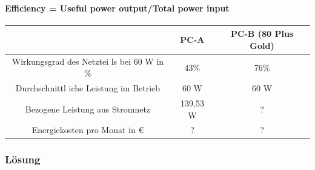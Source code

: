 \documentclass[a4paper]{article}
\begin{document}
            \paragraph{\color{codegreen} Efficiency = Useful power output/Total power input}
            \begin{center}
                \begin{tabular}{|c|c|c|}
                    \hline
                    & {\color[HTML]{32CB00} PC-A} & {\color[HTML]{32CB00} PC-B \color[HTML]{FFD700}(80 Plus Gold)} \\ \hline
                    {\color[HTML]{32CB00} Wirkungsgrad des Netztei ls bei 60 W in \%} & {\color[HTML]{32CB00} 43\%}    & {\color[HTML]{32CB00} 76\%} \\ \hline
                    {\color[HTML]{32CB00} Durchschnittl iche Leistung im Betrieb}    & {\color[HTML]{32CB00} 60 W}     & {\color[HTML]{32CB00} 60 W}  \\ \hline
                    {\color[HTML]{32CB00} Bezogene Leistung aus Stromnetz}           & {\color[HTML]{32CB00} 139,53 W} & {\color[HTML]{FE0000} ?}    \\ \hline
                    {\color[HTML]{32CB00} Energiekosten pro Monat in €}              & {\color[HTML]{CB0000} ?}       & {\color[HTML]{FE0000} ?}    \\ \hline
                \end{tabular}
            \end{center}

    \subsubsection{\color{white} \colorbox{codegreen}{Lösung}}
\end{document}
